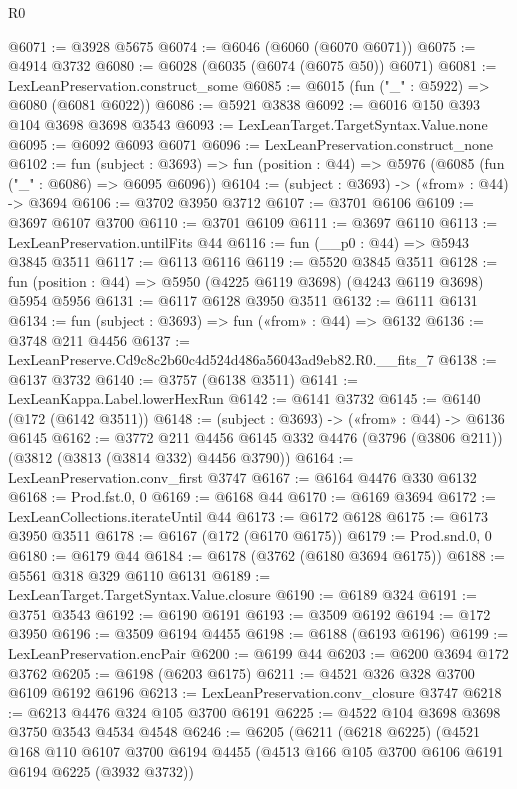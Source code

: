 \begin{lexlean}{R0}
\begin{coremodule}
@6071 := @3928 @5675
@6074 := @6046 (@6060 (@6070 @6071))
@6075 := @4914 @3732
@6080 := @6028 (@6035 (@6074 (@6075 @50)) @6071)
@6081 := LexLeanPreservation.construct_some
@6085 := @6015 (fun ("_" : @5922) => @6080 (@6081 @6022))
@6086 := @5921 @3838
@6092 := @6016 @150 @393 @104 @3698 @3698 @3543
@6093 := LexLeanTarget.TargetSyntax.Value.none
@6095 := @6092 @6093 @6071
@6096 := LexLeanPreservation.construct_none
@6102 := fun (subject : @3693) =>
  fun (position : @44) => @5976 (@6085 (fun ("_" : @6086) => @6095 @6096))
@6104 := (subject : @3693) -> («from» : @44) -> @3694
@6106 := @3702 @3950 @3712
@6107 := @3701 @6106
@6109 := @3697 @6107 @3700
@6110 := @3701 @6109
@6111 := @3697 @6110
@6113 := LexLeanPreservation.untilFits @44
@6116 := fun (__p0 : @44) => @5943 @3845 @3511
@6117 := @6113 @6116
@6119 := @5520 @3845 @3511
@6128 := fun (position : @44) => @5950 (@4225 @6119 @3698) (@4243 @6119 @3698) @5954 @5956
@6131 := @6117 @6128 @3950 @3511
@6132 := @6111 @6131
@6134 := fun (subject : @3693) => fun («from» : @44) => @6132
@6136 := @3748 @211 @4456
@6137 := LexLeanPreserve.Cd9c8c2b60c4d524d486a56043ad9eb82.R0.__fits_7
@6138 := @6137 @3732
@6140 := @3757 (@6138 @3511)
@6141 := LexLeanKappa.Label.lowerHexRun
@6142 := @6141 @3732
@6145 := @6140 (@172 (@6142 @3511))
@6148 := (subject : @3693) -> («from» : @44) -> @6136 @6145
@6162 := @3772
    @211
    @4456
    @6145
    @332
    @4476
    (@3796 (@3806 @211))
    (@3812 (@3813 (@3814 @332) @4456 @3790))
@6164 := LexLeanPreservation.conv_first @3747
@6167 := @6164 @4476 @330 @6132
@6168 := Prod.fst.{0, 0}
@6169 := @6168 @44
@6170 := @6169 @3694
@6172 := LexLeanCollections.iterateUntil @44
@6173 := @6172 @6128
@6175 := @6173 @3950 @3511
@6178 := @6167 (@172 (@6170 @6175))
@6179 := Prod.snd.{0, 0}
@6180 := @6179 @44
@6184 := @6178 (@3762 (@6180 @3694 @6175))
@6188 := @5561 @318 @329 @6110 @6131
@6189 := LexLeanTarget.TargetSyntax.Value.closure
@6190 := @6189 @324
@6191 := @3751 @3543
@6192 := @6190 @6191
@6193 := @3509 @6192
@6194 := @172 @3950
@6196 := @3509 @6194 @4455
@6198 := @6188 (@6193 @6196)
@6199 := LexLeanPreservation.encPair
@6200 := @6199 @44
@6203 := @6200 @3694 @172 @3762
@6205 := @6198 (@6203 @6175)
@6211 := @4521 @326 @328 @3700 @6109 @6192 @6196
@6213 := LexLeanPreservation.conv_closure @3747
@6218 := @6213 @4476 @324 @105 @3700 @6191
@6225 := @4522 @104 @3698 @3698 @3750 @3543 @4534 @4548
@6246 := @6205
    (@6211
      (@6218 @6225)
      (@4521
        @168
        @110
        @6107
        @3700
        @6194
        @4455
        (@4513 @166 @105 @3700 @6106 @6191 @6194 @6225 (@3932 @3732))

\end{coremodule}
\end{lexlean}
